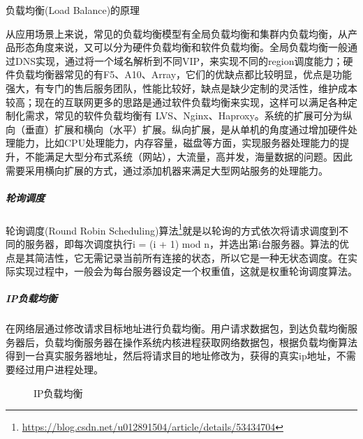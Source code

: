 \documentclass[8pt]{book}
\makeatletter
\numberwithin{dummy}{section}
\theoremstyle{ocrenumbox}
\theoremstyle{blacknumex}
\theoremstyle{blacknumbox}
\theoremstyle{ocrenum}
\renewcommand\paragraph{\@startsection{paragraph}{4}{\z@}
	{-2ex \@plus-.2ex \@minus .2ex}
	{.1ex}
	{\normalfont\small\sffamily\bfseries}}
\makeatother
\begin{document}
\paragraph{负载均衡(Load Balance)的原理}

从应用场景上来说，常见的负载均衡模型有全局负载均衡和集群内负载均衡，从产品形态角度来说，又可以分为硬件负载均衡和软件负载均衡。全局负载均衡一般通过DNS实现，通过将一个域名解析到不同VIP，来实现不同的region调度能力；硬件负载均衡器常见的有F5、A10、Array，它们的优缺点都比较明显，优点是功能强大，有专门的售后服务团队，性能比较好，缺点是缺少定制的灵活性，维护成本较高；现在的互联网更多的思路是通过软件负载均衡来实现，这样可以满足各种定制化需求，常见的软件负载均衡有 LVS、Nginx、Haproxy。系统的扩展可分为纵向（垂直）扩展和横向（水平）扩展。纵向扩展，是从单机的角度通过增加硬件处理能力，比如CPU处理能力，内存容量，磁盘等方面，实现服务器处理能力的提升，不能满足大型分布式系统（网站），大流量，高并发，海量数据的问题。因此需要采用横向扩展的方式，通过添加机器来满足大型网站服务的处理能力。

\subparagraph{轮询调度}

轮询调度(Round Robin Scheduling)算法\footnote{\url{https://blog.csdn.net/u012891504/article/details/53434704}}就是以轮询的方式依次将请求调度到不同的服务器，即每次调度执行i = (i + 1) mod n，并选出第i台服务器。算法的优点是其简洁性，它无需记录当前所有连接的状态，所以它是一种无状态调度。在实际实现过程中，一般会为每台服务器设定一个权重值，这就是权重轮询调度算法。

\subparagraph{IP负载均衡}

在网络层通过修改请求目标地址进行负载均衡。用户请求数据包，到达负载均衡服务器后，负载均衡服务器在操作系统内核进程获取网络数据包，根据负载均衡算法得到一台真实服务器地址，然后将请求目的地址修改为，获得的真实ip地址，不需要经过用户进程处理。

\begin{figure}[htpb]
	\centering
	\caption{IP负载均衡}
	\label{fig:iploadbalance}
\end{figure}
\end{document}
